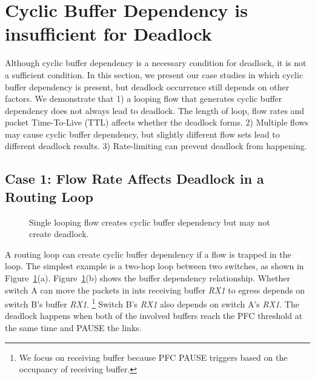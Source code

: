 \section{Cyclic Buffer Dependency is insufficient for Deadlock}
\label{sec:analysis}

Although cyclic buffer dependency is a necessary condition for deadlock, it is not a
sufficient condition. In this section, we present our case studies in which cyclic 
buffer dependency is present, but deadlock occurrence still depends on other factors. We demonstrate 
that 1) a looping flow that generates cyclic buffer dependency does not always lead to deadlock. 
The length of loop, flow rates and packet Time-To-Live (TTL) affects whether 
the deadlock forms. 2) Multiple flows may cause cyclic buffer dependency,
but slightly different flow sets lead to different deadlock results. 3) Rate-limiting can
prevent deadlock from happening.

\subsection{Case 1: Flow Rate Affects Deadlock in a Routing Loop}

\begin{figure}[t]
\centering
{}
\caption{Single looping flow creates cyclic buffer dependency but may not create deadlock.}
\label{fig:loop}
\end{figure}


A routing loop can create cyclic buffer dependency if a flow is trapped in the loop.
The simplest example is a two-hop loop between two switches, as shown in Figure~\ref{fig:loop}(a).
Figure~\ref{fig:loop}(b) shows the buffer dependency relationship. Whether switch A can move
the packets in ints receiving buffer {\em RX1} to egress depends on switch B's buffer {\em RX1}.
\footnote{We focus on receiving buffer because PFC PAUSE triggers based on the occupancy of receiving buffer.}
Switch B's {\em RX1} also depends on switch A's {\em RX1}. The deadlock happens when
both of the involved buffers reach the PFC threshold at the same time and PAUSE the links.



